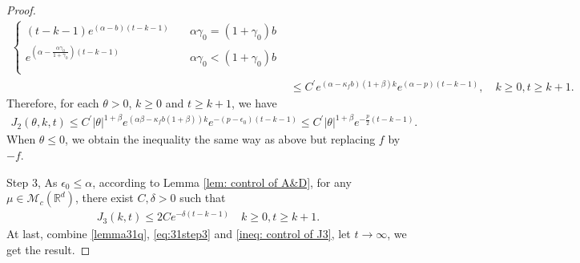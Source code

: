 \documentclass[12pt,oneside,english]{amsart}
\theoremstyle{plain}
\theoremstyle{definition}
\numberwithin{equation}{section}
\begin{document}
\begin{proof}
{\begin{align}
\begin{cases}
    (t-k-1)e^{(\alpha-b)(t-k-1)}\quad &\alpha\gamma_0=(1+\gamma_0)b\\
    e^{(\alpha-\frac{\alpha\gamma_0}{1+\gamma_0})(t-k-1)}\quad &\alpha\gamma_0<(1+\gamma_0)b\\
    \end{cases}
    \\& \leq C^{'}e^{(\alpha-\kappa_f b)(1+\beta)k}e^{(\alpha-p)(t-k-1)}, \quad k\geq 0, t\geq k+1.
\end{align}
}
Therefore, for each $\theta>0$, $ k\geq 0$ and $t\geq k+1$, we have
\begin{align}
J_2(\theta,k,t)\leq C^{'} |\theta|^{1+\beta}e^{(\alpha\beta-\kappa_fb(1+\beta))k}e^{-(p-\epsilon_0)(t-k-1)} \leq C^{'} |\theta|^{1+\beta}e^{-\frac{p}{2}(t-k-1)}.
\end{align}
When $\theta\leq 0$, we obtain the inequality the same way as above but replacing $f$ by $-f$.

Step 3, As $\epsilon_0\leq \alpha$, according to Lemma \ref{lem: control of A&D}, for any $\mu\in \mathcal{M}_c(\mathbb{R}^d)$, there exist $C,\delta>0$ such that 
\begin{align}\label{ineq: control of J3}
    J_3(k,t)\leq 2Ce^{-\delta (t-k-1)}\quad k\geq0, t\geq k+1.
\end{align}
At last, combine \eqref{lemma31q}, \eqref{eq:31step3} and \eqref{ineq: control of J3}, let $t\rightarrow\infty$, we get the result.
\end{proof}
\end{document}
